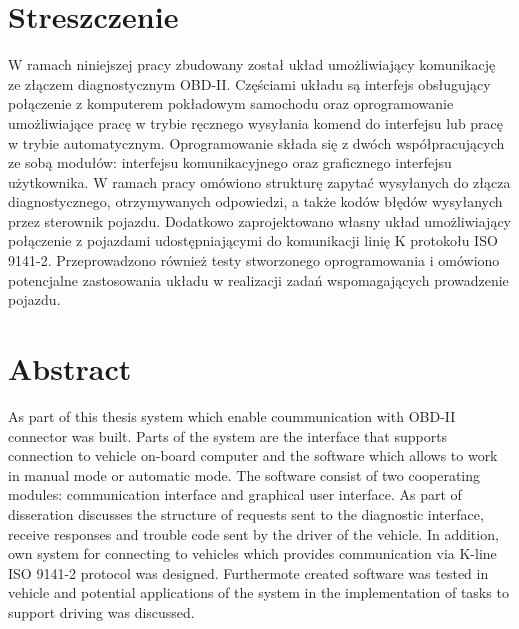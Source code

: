 \documentclass[12pt]{article} %
\numberwithin{equation}{subsection}
\numberwithin{figure}{section}
\numberwithin{table}{section}
\begin{document}
\section*{Streszczenie}
\vspace{0.5cm}
\hspace{0.5cm}W ramach niniejszej pracy zbudowany został układ umożliwiający komunikację ze złączem diagnostycznym OBD-II. Częściami układu są interfejs obsługujący połączenie z komputerem pokładowym samochodu oraz oprogramowanie umożliwiające pracę w trybie ręcznego wysyłania komend do interfejsu lub pracę w trybie automatycznym. Oprogramowanie składa się z dwóch współpracujących ze sobą modułów: interfejsu komunikacyjnego oraz graficznego interfejsu użytkownika. W ramach pracy omówiono strukturę zapytać wysyłanych do złącza diagnostycznego, otrzymywanych odpowiedzi, a także kodów błędów wysyłanych przez sterownik pojazdu. Dodatkowo zaprojektowano własny układ umożliwiający połączenie z pojazdami udostępniającymi do komunikacji linię K protokołu ISO 9141-2. Przeprowadzono również testy stworzonego oprogramowania i omówiono potencjalne zastosowania układu w realizacji zadań wspomagających prowadzenie pojazdu.
\newpage

\section*{Abstract}
\vspace{0.5cm}
\hspace{0.5cm}As part of this thesis system which enable coummunication with OBD-II connector was built. Parts of the system are the interface that supports connection to vehicle on-board computer and the software which allows to work in manual mode or automatic mode. The software consist of two cooperating modules: communication interface and graphical user interface. As part of disseration discusses the structure of requests sent to the diagnostic interface, receive responses and trouble code sent by the driver of the vehicle. In addition, own system for connecting to vehicles which provides communication via K-line ISO 9141-2 protocol was designed. Furthermote created software was tested in vehicle and potential applications of the system in the implementation of tasks to support driving was discussed. 


\thispagestyle{empty}
\vspace{0.5cm}
\hspace{0.5cm}

\newpage
\end{document}

